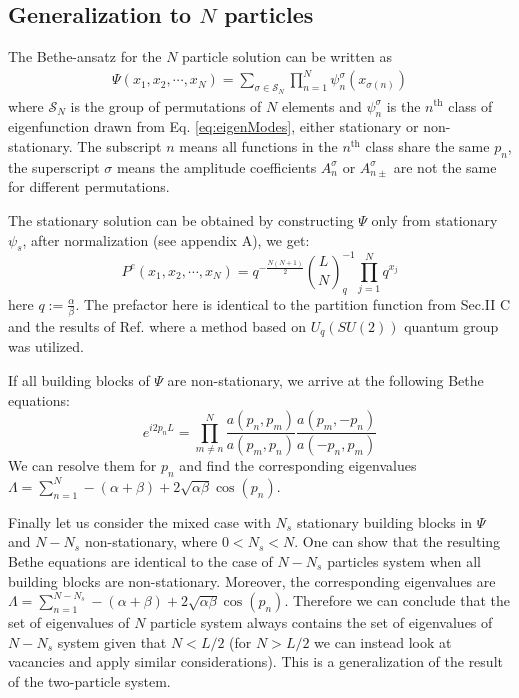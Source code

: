 \documentclass[aps,showpacs,twocolumn,floatfix,prx,superscriptaddress]{revtex4-1}
\begin{document}
\subsection{Generalization to $N$ particles}
The Bethe-ansatz for the $N$ particle solution can be written as
\begin{equation}
    \label{eq:ansatzN}
    \begin{aligned}
        \Psi(x_1, x_2, \cdots, x_N) = \sum_{\sigma\in \mathcal{S}_N}
        \prod_{n=1}^N \psi_n^{\sigma}(x_{\sigma(n)})
    \end{aligned}
\end{equation}
where $\mathcal{S}_N$ is the group of permutations of $N$ elements and $\psi_n^{\sigma}$ is the $n^{\text{th}}$ class of eigenfunction drawn from Eq.  \eqref{eq:eigenModes}, either stationary or non-stationary. The subscript $n$ means all functions in the $n^{\text{th}}$ class share the same $p_n$, the superscript $\sigma$ means the amplitude coefficients $A_n^{\sigma}$ or $A_{n\pm}^{\sigma}$ are not the same for different permutations.

The stationary solution can be obtained by constructing $\Psi$ only from stationary $\psi_s$, after normalization (see appendix A), we get: 
\begin{equation}
    \label{eq:stationarySolutionN}
    P^e(x_1, x_2, \cdots, x_N) = q^{-\frac{N(N+1)}{2}}
    \binom{L}{N}_q^{-1}\prod_{j=1}^N{q^{x_j}}
\end{equation}
here $q:=\frac{\alpha}{\beta}$. The prefactor here is identical to the partition function from Sec.II C and the results of Ref.\cite{Sandow1994} where a method based on $U_q(SU(2))$ quantum group was utilized.

If all building blocks of $\Psi$ are non-stationary, we arrive at the following Bethe equations:
\begin{equation}
    \label{eq:betheEqN}
    e^{i2p_nL}  =  \prod_{m\neq n}^N\frac{a(p_n, p_m)}{a(p_m, p_n)} 
    \frac{a(p_m, -p_n)}{a(-p_n, p_m)}
\end{equation}
We can resolve them for $p_n$ and find the corresponding eigenvalues $\Lambda=\sum_{n=1}^N -(\alpha+\beta) + 2\sqrt{\alpha\beta}\cos(p_n)$. 

Finally let us consider the mixed case with $N_s$ stationary building blocks in $\Psi$ and $N-N_s$ non-stationary, where $0<N_s<N$. One can show that the resulting Bethe equations are identical to the case of $N-N_s$ particles system when all building blocks are non-stationary. Moreover, the corresponding eigenvalues are $\Lambda = \sum_{n=1}^{N-N_s} -(\alpha+\beta)+2\sqrt{\alpha\beta}\cos(p_n)$. Therefore we can conclude that the set of eigenvalues of $N$ particle system always contains the set of eigenvalues of $N-N_s$ system given that $N<L/2$ (for $N>L/2$ we can instead look at vacancies and apply similar considerations). This is a generalization of the result of the two-particle system.
\end{document}
